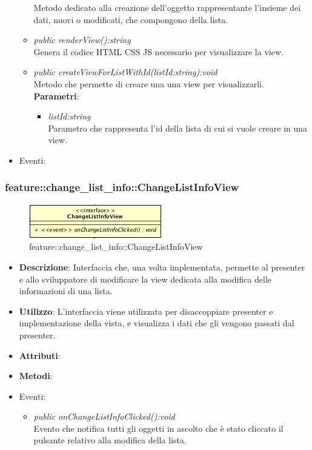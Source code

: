 \begin{itemize}
\begin{itemize}
	 	Metodo dedicato alla creazione dell'oggetto rappresentante l'insieme dei dati, nuovi o modificati, che compongono della lista.
	\item \textit{public renderView():string}\\
	Genera il codice HTML CSS JS necessario per visualizzare la view.
	\item \textit{public createViewForListWithId(listId:string):void}\\
		Metodo che permette di creare una una view per visualizzarli.
			\\ \textbf{Parametri}: \begin{itemize}
			\item \textit{listId:string}\\
			Parametro che rappresenta l'id della lista di cui si vuole creare in una view.
			\end{itemize} 
	\end{itemize}
\item{Eventi}:
\end{itemize}

\subsubsection{feature::change\_list\_info::ChangeListInfoView}

\label{feature::change_list_info::ChangeListInfoView}
\begin{figure}[H]
	\centering
	\includegraphics[scale=0.5]{Sezioni/SottosezioniST/img/app/ChangeListInfoView.png}
	\caption{feature::change\_list\_info::ChangeListInfoView}
\end{figure}

\begin{itemize}
\item \textbf{Descrizione}: Interfaccia che, una volta implementata, permette al presenter e allo sviluppatore di modificare la view dedicata alla modifica delle informazioni di una lista.
\item \textbf{Utilizzo}: L'interfaccia viene utilizzata per disaccoppiare presenter e implementazione della vista, e visualizza i dati che gli vengono passati dal presenter.
\item \textbf{Attributi}: 
\item \textbf{Metodi}:
\item{Eventi}:
	\begin{itemize}	
	\item \textit{public onChangeListInfoClicked():void}\\
		Evento che notifica tutti gli oggetti in ascolto che è stato cliccato il pulsante relativo alla modifica della lista.
	\end{itemize}
\end{itemize}

